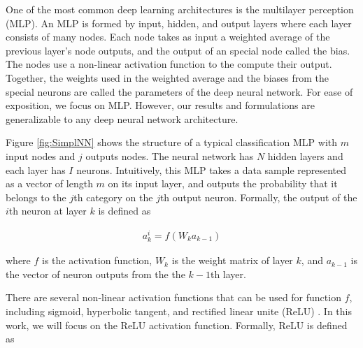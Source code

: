 \documentclass[letterpaper]{article}
\begin{document}
\begin{flushleft}
{One of the most common deep learning architectures is the multilayer perception (MLP). 
An MLP is formed by input, hidden, and output layers where each layer consists of many nodes. Each node takes 
as input a weighted average of the previous layer's node outputs, and the output of an special node called the bias.  
The nodes use a non-linear activation function to the compute their output. Together, the weights used in the weighted average and
the biases from the special neurons are called the parameters of the deep neural network. 
For ease of exposition, we focus on MLP. However, our results and formulations are generalizable to any deep neural network
architecture. 




Figure \ref{fig:SimplNN} shows the structure of a typical classification MLP with $m$ input nodes and $j$ outputs nodes. The neural network
has $N$ hidden layers and each layer has $I$ neurons. Intuitively, this MLP takes a data sample represented as a vector of length
$m$ on its input layer, and outputs the probability that it belongs to the $j$th category on the $j$th output neuron.
Formally, the output of the $i$th neuron at layer $k$ is defined as

\begin{align}\label{eq:neuronOutput}
a^i_k=f(W_k a_{k-1})
\end{align}

where $f$ is the activation function, $W_k$ is the weight matrix of layer $k$,
and $a_{k-1}$ is the vector of neuron outputs from the the $k-1$th layer. 

There are several non-linear activation functions that can be used for function $f$, including sigmoid,
hyperbolic tangent, and rectified linear unite (ReLU) \cite{Goodfellow-et-al-2016}. In this
work, we will focus on the ReLU activation function. Formally, ReLU is defined as 

}
\end{flushleft}
\end{document}
